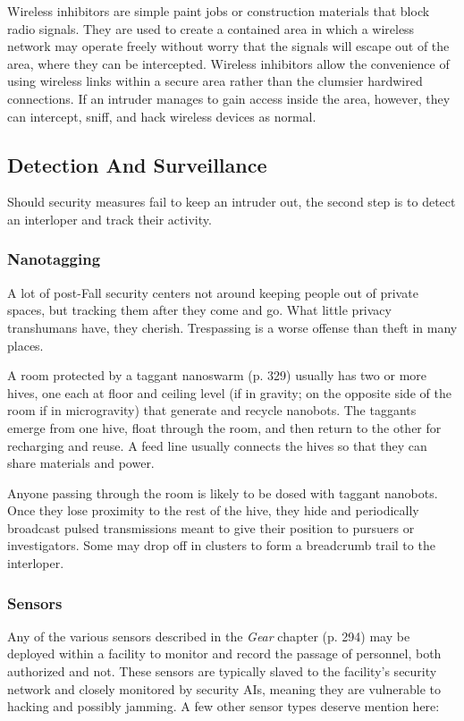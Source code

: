 Wireless inhibitors are simple paint jobs or construction
materials that block radio signals. They are
used to create a contained area in which a wireless 
network may operate freely without worry that the 
signals will escape out of the area, where they can 
be intercepted. Wireless inhibitors allow the convenience
of using wireless links within a secure area
rather than the clumsier hardwired connections. If 
an intruder manages to gain access inside the area, 
however, they can intercept, sniff, and hack wireless 
devices as normal.

\subsection{Detection And Surveillance}

Should security measures fail to keep an intruder 
out, the second step is to detect an interloper and 
track their activity.

\subsubsection{Nanotagging}

A lot of post-Fall security centers not around keeping 
people out of private spaces, but tracking them after 
they come and go. What little privacy transhumans 
have, they cherish. Trespassing is a worse offense 
than theft in many places.

A room protected by a taggant nanoswarm (p. 329) 
usually has two or more hives, one each at floor and 
ceiling level (if in gravity; on the opposite side of the 
room if in microgravity) that generate and recycle 
nanobots. The taggants emerge from one hive, float 
through the room, and then return to the other for 
recharging and reuse. A feed line usually connects the 
hives so that they can share materials and power.

Anyone passing through the room is likely to be 
dosed with taggant nanobots. Once they lose proximity
to the rest of the hive, they hide and periodically
broadcast pulsed transmissions meant to give their position
to pursuers or investigators. Some may drop off
in clusters to form a breadcrumb trail to the interloper.

\subsubsection{Sensors}

Any of the various sensors described in the \textit{Gear}
chapter (p. 294) may be deployed within a facility 
to monitor and record the passage of personnel, 
both authorized and not. These sensors are typically 
slaved to the facility's security network and closely 
monitored by security AIs, meaning they are vulnerable
to hacking and possibly jamming. A few other
sensor types deserve mention here:

